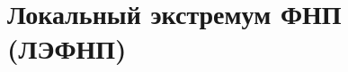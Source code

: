 \documentclass[../main.tex]{subfiles}
\begin{document}
 \chapter{Локальный экстремум ФНП (ЛЭФНП)}
 
 
\end{document}
